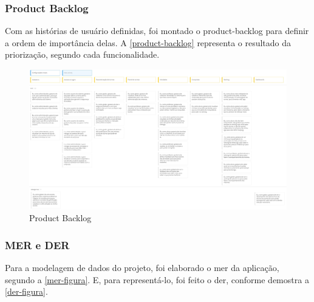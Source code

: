 \subsubsection{Product Backlog}
Com as histórias de usuário definidas, foi montado o \gls{product-backlog} para definir a ordem de importância delas. A \autoref{product-backlog} representa o resultado da priorização, segundo cada funcionalidade.  
\begin{PAGINA-A3}

\begin{figure}[p]
    \centering \includegraphics[height=\textheight,width=\textwidth,keepaspectratio]{imagens/UserStoryMappingFrameworkHD.jpg}
	\caption{\label{product-backlog}Product Backlog}
\end{figure}

\end{PAGINA-A3}

\subsubsection{MER e DER}
Para a modelagem de dados do projeto, foi elaborado o \ac{mer} da aplicação, segundo a \autoref{mer-figura}. E, para representá-lo, foi feito o \ac{der}, conforme demostra a \autoref{der-figura}.

